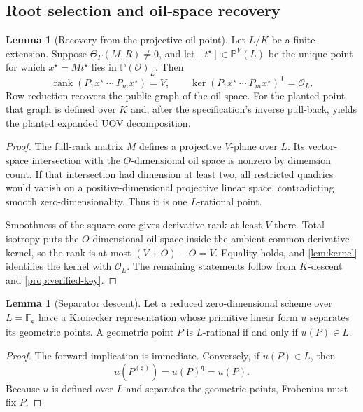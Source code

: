 \documentclass[11pt,a4paper]{article}
\theoremstyle{definition}
\newtheorem{lemma}[theorem]{Lemma}
\theoremstyle{remark}
\newcommand{\F}{\mathbb F}
\newcommand{\PP}{\mathbb P}
\newcommand{\cO}{\mathcal O}
\newcommand{\rank}{\operatorname{rank}}
\begin{document}
\subsection{Root selection and oil-space recovery}\label{subsec:root-recovery}

\begin{lemma}[Recovery from the projective oil point]\label{lem:descent}
Let $L/K$ be a finite extension.  Suppose $\Theta_F(M,R)\ne0$, and let $[t^\star]\in\PP^V(L)$ be the unique point for which $x^\star=Mt^\star$ lies in $\PP(\cO)_L$.  Then
\[
\rank(P_1x^\star\ \cdots\ P_mx^\star)=V,
\qquad
\ker(P_1x^\star\ \cdots\ P_mx^\star)^{\mathsf T}=\cO_L.
\]
Row reduction recovers the public graph of the oil space.  For the planted point that graph is defined over $K$ and, after the specification's inverse pull-back, yields the planted expanded UOV decomposition.
\end{lemma}

\begin{proof}
The full-rank matrix $M$ defines a projective $V$-plane over $L$.  Its vector-space intersection with the $O$-dimensional oil space is nonzero by dimension count.  If that intersection had dimension at least two, all restricted quadrics would vanish on a positive-dimensional projective linear space, contradicting smooth zero-dimensionality.  Thus it is one $L$-rational point.

Smoothness of the square core gives derivative rank at least $V$ there.  Total isotropy puts the $O$-dimensional oil space inside the ambient common derivative kernel, so the rank is at most $(V+O)-O=V$.  Equality holds, and \cref{lem:kernel} identifies the kernel with $\cO_L$.  The remaining statements follow from $K$-descent and \cref{prop:verified-key}.
\end{proof}

\begin{lemma}[Separator descent]\label{lem:separator-descent}
Let a reduced zero-dimensional scheme over $L=\F_{\mathfrak q}$ have a Kronecker representation whose primitive linear form $u$ separates its geometric points.  A geometric point $P$ is $L$-rational if and only if $u(P)\in L$.
\end{lemma}

\begin{proof}
The forward implication is immediate.  Conversely, if $u(P)\in L$, then
\[
u(P^{(\mathfrak q)})=u(P)^{\mathfrak q}=u(P).
\]
Because $u$ is defined over $L$ and separates the geometric points, Frobenius must fix $P$.
\end{proof}
\end{document}
